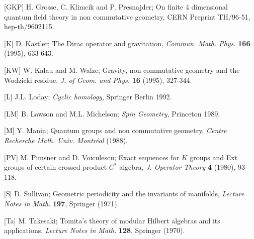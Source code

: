 \item{[GKP]} H. Grosse, C. Klimcik and P. Presnajder; On
finite 4 dimensional quantum field theory in
non commutative geometry, CERN Preprint TH/96-51,
hep-th/9602115.

\item{[K]} D. Kastler; The Dirac operator and
gravitation, {\it Commun. Math. Phys.} {\bf 166} (1995),
633-643.

\item{[KW]} W. Kalau and M. Walze; Gravity, non
commutative geometry and the \break Wodzicki residue, {\it
J. of Geom. and Phys.} {\bf 16} (1995), 327-344.

\item{[L]} J.L. Loday; {\it Cyclic homology}, Springer
Berlin 1992.

\item{[LM]} B. Lawson and M.L. Michelson; {\it Spin
Geometry}, Princeton 1989.

\item{[M]} Y. Manin; Quantum groups and non commutative
geometry, {\it Centre Recherche Math. Univ.
Montr\'eal} (1988).

\item{[PV]} M. Pimsner and D. Voiculescu; Exact sequences
for $K$ groups and Ext groups of certain crossed product
$C^*$ algebra, {\it J. Operator Theory} {\bf 4} (1980),
93-118.

\item{[S]} D. Sullivan; Geometric periodicity and the
invariants of manifolds, {\it Lecture Notes in Math.}
{\bf 197}, Springer (1971).

\item{[Ta]} M. Takesaki; Tomita's theory of modular
Hilbert algebras and its applications, {\it Lecture Notes
in Math.} {\bf 128}, Springer (1970).






\bye

